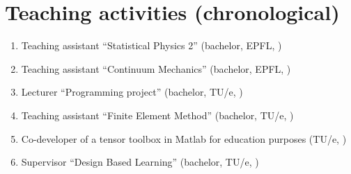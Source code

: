 \documentclass[
    bibsize = normalsize,
    bibpackage = none,
    paragraphshape = display,
    paragraphafter = none,
]{goose-article}
\begin{document}
\begin{refsection}[publications]
    \nocite{*}
    \printbibliography[locallabelwidth, title={Publications (chronological)}]
\end{refsection}

\begin{refsection}[invited]
    \nocite{*}
    \printbibliography[locallabelwidth, title={Conferences (invited oral)}]
\end{refsection}

\begin{refsection}[conferences]
    \nocite{*}
    \printbibliography[locallabelwidth, title={Conferences (oral)}]
\end{refsection}

\begin{refsection}[posters]
    \nocite{*}
    \printbibliography[locallabelwidth, title={Conferences (posters)}]
\end{refsection}

\begin{refsection}[seminars]
    \nocite{*}
    \printbibliography[locallabelwidth, title={Colloquia (invited)}]
\end{refsection}

\begin{refsection}[students]
    \nocite{*}
    \printbibliography[locallabelwidth, title={(Co-)Supervised junior researchers: PhD, master, bachelor (chronological)}]
\end{refsection}

\section*{Teaching activities (chronological)}

\begin{enumerate}
    \itemsep0em
    \item Teaching assistant ``Statistical Physics 2'' (bachelor, EPFL, \MyDateTeachingEPFLStatPhys)
    \item Teaching assistant ``Continuum Mechanics'' (bachelor, EPFL, \MyDateTeachingEPFLContinuum)
    \item Lecturer ``Programming project'' (bachelor, TU/e, \MyDateTeachingTUeProgramming)
    \item Teaching assistant ``Finite Element Method'' (bachelor, TU/e, \MyDateTeachingTUeFEM)
    \item Co-developer of a tensor toolbox in Matlab for education purposes (TU/e, \MyDateTeachingTUeMatlab)
    \item Supervisor ``Design Based Learning'' (bachelor, TU/e, \MyDateTeachingTUeDBL)
\end{enumerate}
\end{document}

